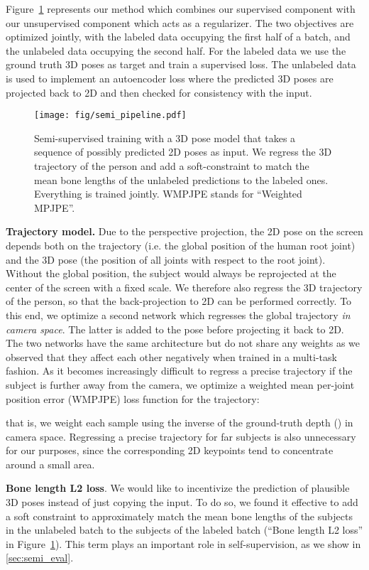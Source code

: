 \documentclass[10pt,twocolumn,letterpaper]{article}
\begin{document}
Figure~\ref{fig:semi_pipeline} represents our method which combines our supervised component with our unsupervised component which acts as a regularizer.
The two objectives are optimized jointly, with the labeled data occupying the first half of a batch, and the unlabeled data occupying the second half. 
For the labeled data we use the ground truth 3D poses as target and train a supervised loss.
The unlabeled data is used to implement an autoencoder loss where the predicted 3D poses are projected back to 2D and then checked for consistency with the input. 

\begin{figure}
	\centering
    \texttt{[image: fig/semi\_pipeline.pdf]}
	\caption{Semi-supervised training with a 3D pose model that takes a sequence of possibly predicted 2D poses as input. 
	We regress the 3D trajectory of the person and add a soft-constraint to match the mean bone lengths of the unlabeled predictions to the labeled ones.
	Everything is trained jointly. WMPJPE stands for ``Weighted MPJPE''.}
	\label{fig:semi_pipeline}
\end{figure}

\noindent\textbf{Trajectory model.}
Due to the perspective projection, the 2D pose on the screen depends both on the trajectory (i.e. the global position of the human root joint) and the 3D pose (the position of all joints with respect to the root joint). Without the global position, the subject would always be reprojected at the center of the screen with a fixed scale.
We therefore also regress the 3D trajectory of the person, so that the back-projection to 2D can be performed correctly. To this end, we optimize a second network which regresses the global trajectory \emph{in camera space}. 
The latter is added to the pose before projecting it back to 2D. 
The two networks have the same architecture but do not share any weights as we observed that they affect each other negatively when trained in a multi-task fashion. 
As it becomes increasingly difficult to regress a precise trajectory if the subject is further away from the camera, we optimize a weighted mean per-joint position error (WMPJPE) loss function for the trajectory:

that is, we weight each sample using the inverse of the ground-truth depth () in camera space. 
Regressing a precise trajectory for far subjects is also unnecessary for our purposes, since the corresponding 2D keypoints tend to concentrate around a small area.

\noindent\textbf{Bone length L2 loss}.
We would like to incentivize the prediction of plausible 3D poses instead of just copying the input.
To do so, we found it effective to add a soft constraint to approximately match the mean bone lengths of the subjects in the unlabeled batch to the subjects of the labeled batch (``Bone length L2 loss'' in Figure~\ref{fig:semi_pipeline}). 
This term plays an important role in self-supervision, as we show in \textsection\ref{sec:semi_eval}.
\end{document}

